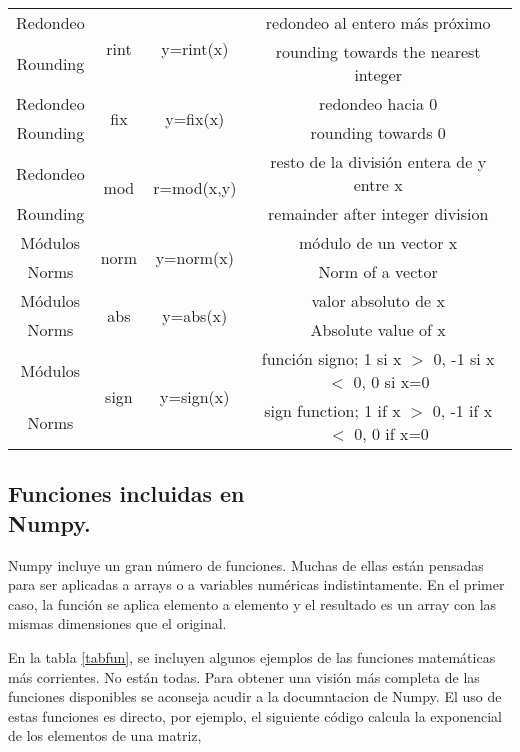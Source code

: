 \begin{table}
\begin{tabular}{c|c|c|c}
\hline
Redondeo&\multirow{2}{*}{rint}&\multirow{2}{*}{y=rint(x)}&redondeo al entero más próximo\\
Rounding& & & rounding towards the nearest integer\\
\hline
Redondeo&\multirow{2}{*}{fix}&\multirow{2}{*}{y=fix(x)}&redondeo hacia $0$\\
Rounding& & & rounding towards $0$\\
\hline
Redondeo&\multirow{2}{*}{mod}&\multirow{2}{*}{r=mod(x,y)}&resto de la división entera de y entre x\\
Rounding& & & remainder after integer division\\
\hline
\hline
Módulos&\multirow{2}{*}{norm}&\multirow{2}{*}{y=norm(x)}& módulo de un vector x\\
Norms & & & Norm of a vector\\
\hline
Módulos&\multirow{2}{*}{abs}&\multirow{2}{*}{y=abs(x)}&valor absoluto de x\\
Norms & & & Absolute value of x\\
\hline
Módulos&\multirow{2}{*}{sign}&\multirow{2}{*}{y=sign(x)}&función signo; 1 si x $>$ 0, -1 si x $<$ 0, 0 si x=0\\
Norms & & &sign function; 1 if x $>$ 0, -1 if x $<$ 0, 0 if x=0\\ 
\end{tabular}
\end{table}

\begin{paracol}{2}
\subsection{Funciones incluidas en\\ Num\-py.} 
Numpy incluye un gran número de funciones. Muchas de ellas  están pensadas para ser aplicadas a arrays o a variables numéricas indistintamente. En el primer caso, la función se aplica elemento a elemento y el resultado es un array con las mismas dimensiones que el original. 

En la tabla \ref{tabfun}, se incluyen algunos ejemplos de las funciones matemáticas más corrientes. No están todas. Para obtener una visión más completa de las funciones disponibles se aconseja acudir a la documntacion de Numpy.
El uso de estas funciones es directo, por ejemplo, el siguiente código calcula la exponencial de los elementos de una matriz,
\end{paracol}

